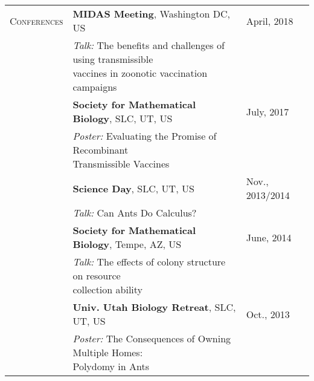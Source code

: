 \documentclass[11pt]{article}
\newcommand{\cellone}{3.5cm} %
\newcommand{\celltwo}{11cm}
\newcommand{\cellthree}{4cm}
\begin{document}
\begin{tabularx}{\textwidth}{p{\cellone} p{\celltwo} p{\cellthree}}
  \parbox[t][0cm]{\cellone}{C\textsc{onferences}}  & \parbox[t][]{\celltwo}{{\bf MIDAS Meeting}, Washington DC, US} & \parbox[t][]{\cellthree}{April, 2018} \\ 
  & \hspace{.2in} \parbox[t][]{\celltwo}{ \emph{Talk: } The benefits and challenges of using transmissible \\
  vaccines in zoonotic vaccination campaigns} \\

  & \vspace{0.1in} \parbox[t][]{\celltwo}{{\bf Society for Mathematical Biology}, SLC, UT, US} & \vspace{0.1in} \parbox[t][]{\cellthree}{July, 2017} \\ 
  & \hspace{.2in} \parbox[t][]{\celltwo}{ \emph{Poster: } Evaluating the Promise of Recombinant \\ Transmissible Vaccines} \\

  
  & \vspace{0.1in} \parbox[t][]{\celltwo}{{\bf Science Day}, SLC, UT, US} & \vspace{0.1in} \parbox[t][]{\cellthree}{Nov., 2013/2014} \\ 
  & \hspace{.2in} \parbox[t][]{\celltwo}{ \emph{Talk: } Can Ants Do Calculus?}\\
  
  
  & \vspace{0.1in} \parbox[t][]{\celltwo}{{\bf Society for Mathematical Biology}, Tempe, AZ, US} & \vspace{0.1in} \parbox[t][]{\cellthree}{June, 2014} \\ 
  & \hspace{.2in} \parbox[t][]{\celltwo}{ \emph{Talk: } The effects of colony structure on resource \\ collection ability} \\
  
											 
  & \vspace{0.1in} \parbox[t][0cm]{\celltwo}{{\bf Univ. Utah Biology Retreat}, SLC, UT, US } & \vspace{0.1in} \parbox[t][]{\cellthree}{Oct., 2013} \\
  & \hspace{.2in} \parbox[t][]{\celltwo}{\emph{Poster:} The Consequences of Owning Multiple Homes: \\ Polydomy in Ants}
\end{tabularx}
\end{document}

